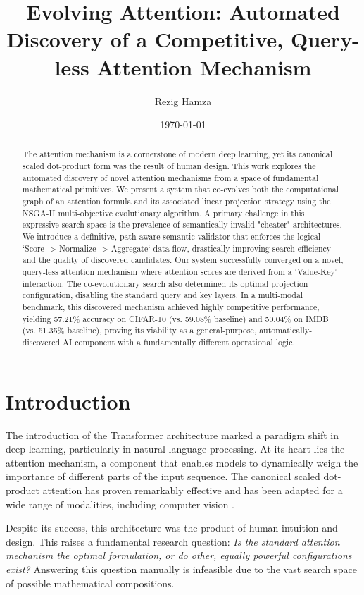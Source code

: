 \documentclass[11pt, a4paper]{article}
\title{\textbf{Evolving Attention: Automated Discovery of a Competitive, Query-less Attention Mechanism}}
\author{Rezig Hamza}
\date{\today}
\begin{document}
\maketitle

\begin{abstract}
The attention mechanism is a cornerstone of modern deep learning, yet its canonical scaled dot-product form was the result of human design. This work explores the automated discovery of novel attention mechanisms from a space of fundamental mathematical primitives. We present a system that co-evolves both the computational graph of an attention formula and its associated linear projection strategy using the NSGA-II multi-objective evolutionary algorithm. A primary challenge in this expressive search space is the prevalence of semantically invalid "cheater" architectures. We introduce a definitive, path-aware semantic validator that enforces the logical `Score -> Normalize -> Aggregate` data flow, drastically improving search efficiency and the quality of discovered candidates. Our system successfully converged on a novel, query-less attention mechanism where attention scores are derived from a `Value-Key` interaction. The co-evolutionary search also determined its optimal projection configuration, disabling the standard query and key layers. In a multi-modal benchmark, this discovered mechanism achieved highly competitive performance, yielding 57.21\% accuracy on CIFAR-10 (vs. 59.08\% baseline) and 50.04\% on IMDB (vs. 51.35\% baseline), proving its viability as a general-purpose, automatically-discovered AI component with a fundamentally different operational logic.
\end{abstract}

\section{Introduction}
The introduction of the Transformer architecture \cite{vaswani2017attention} marked a paradigm shift in deep learning, particularly in natural language processing. At its heart lies the attention mechanism, a component that enables models to dynamically weigh the importance of different parts of the input sequence. The canonical scaled dot-product attention has proven remarkably effective and has been adapted for a wide range of modalities, including computer vision \cite{dosovitskiy2020image}.

Despite its success, this architecture was the product of human intuition and design. This raises a fundamental research question: \textit{Is the standard attention mechanism the optimal formulation, or do other, equally powerful configurations exist?} Answering this question manually is infeasible due to the vast search space of possible mathematical compositions.
\end{document}
